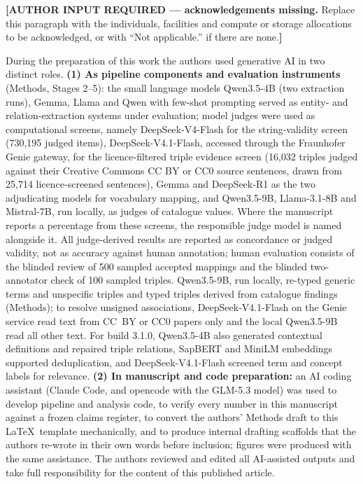 \documentclass[referee,lineno,pdflatex,sn-vancouver-num]{sn-jnl}
\theoremstyle{thmstyleone}%
\theoremstyle{thmstyletwo}%
\theoremstyle{thmstylethree}%
\begin{document}

\textbf{[AUTHOR INPUT REQUIRED --- acknowledgements missing.} Replace this
paragraph with the individuals, facilities and compute or storage allocations
to be acknowledged, or with ``Not applicable.'' if there are none.\textbf{]}

During the preparation of this work the
authors used generative AI in two distinct roles.
\textbf{(1) As pipeline components and evaluation instruments} (Methods,
Stages 2--5): the small language models Qwen3.5-4B (two extraction runs),
Gemma, Llama and Qwen with few-shot prompting served as entity- and
relation-extraction systems under evaluation; model judges were used as
computational screens, namely DeepSeek-V4-Flash for the string-validity
screen (730{,}195 judged items), DeepSeek-V4.1-Flash, accessed through the
Fraunhofer Genie gateway, for the licence-filtered triple evidence screen
(16{,}032 triples judged against their Creative Commons CC BY or CC0 source
sentences, drawn from 25{,}714 licence-screened sentences), Gemma and
DeepSeek-R1 as the two adjudicating models for vocabulary mapping, and
Qwen3.5-9B, Llama-3.1-8B and Mistral-7B, run locally, as judges of
catalogue values. Where the
manuscript reports a percentage from these screens, the responsible judge
model is named alongside it. All judge-derived results are reported as
concordance or judged validity, not as accuracy against human annotation;
human evaluation consists of the blinded review of 500 sampled accepted
mappings and the blinded two-annotator check of 100 sampled triples. Qwen3.5-9B, run locally, re-typed generic terms and unspecific
triples and typed triples derived from catalogue findings (Methods); to
resolve unsigned associations, DeepSeek-V4.1-Flash on the Genie service
read text from CC~BY or CC0 papers only and the local Qwen3.5-9B read all
other text. For build 3.1.0, Qwen3.5-4B also generated contextual
definitions and repaired triple relations, SapBERT and MiniLM embeddings
supported deduplication, and DeepSeek-V4.1-Flash screened term and concept
labels for relevance.
\textbf{(2) In manuscript and code preparation:} an AI coding assistant
(Claude Code, and opencode with the GLM-5.3 model) was used to develop
pipeline and analysis code, to verify every number in this manuscript
against a frozen claims register, to convert the authors' Methods draft to
this \LaTeX\ template mechanically, and to produce internal drafting
scaffolds that the authors re-wrote in their own words before inclusion;
figures were produced with the same assistance. The authors reviewed and
edited all AI-assisted outputs and take full responsibility for the content
of this published article.


\end{document}
